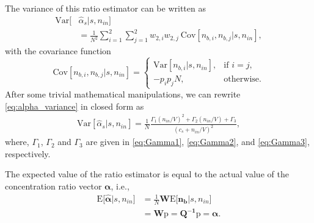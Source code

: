 \documentclass[twocolumn]{IEEEtran}
\newcommand{\p}{\mathrm{p}}
\newcommand{\E}{\mathrm{E}}
\newcommand{\Var}{\mathrm{Var}}
\newcommand{\Cov}{\mathrm{Cov}}
\begin{document}
The variance of this ratio estimator can be written as
\begin{align}\label{eq:alpha_variance}
\Var[&\hat{\alpha}_s|s, n_{in}] \\ \nonumber
&= \frac{1}{N^2}  \sum_{i=1}^2 \sum_{j=1}^2 w_{2,i} w_{2,j} ~\Cov[n_{b,i}, n_{b,j}|s, n_{in}],  
\end{align}
with the covariance function
\begin{equation}
\Cov[n_{b,i}, n_{b,j}| s, n_{in}]  = 
\begin{cases}
\Var[n_{b,i}| s, n_{in}],  & \text{if } i = j,\\
-p_i p_j N,    & \text{otherwise}.
\end{cases}
\label{eq:est_covariance}
\end{equation}
After some trivial mathematical manipulations, we can rewrite \eqref{eq:alpha_variance} in closed form as 
\begin{align}
\Var[\hat{\alpha}_s|s, n_{in}] = \frac{1}{N} \frac{\Gamma_1 (n_{in}/V)^2 + \Gamma_2 (n_{in}/V) + \Gamma_3}{(c_s + n_{in}/V)^2},  \label{eq:est_variance}
\end{align}
where, $\Gamma_1$, $\Gamma_2$ and $\Gamma_3$ are given in \eqref{eq:Gamma1}, \eqref{eq:Gamma2}, and \eqref{eq:Gamma3}, respectively.
\addtocounter{equation}{3}  


The expected value of the ratio estimator is equal to the actual value of the concentration ratio vector $\bm{\alpha}$, i.e.,
\begin{align}
\bm{\E[\hat{\alpha}}|s, n_{in} \bm{]} &= \frac{1}{N} \bm{W} \bm{\E[n_b}|s,n_{in}\bm{]}  \\ \nonumber
&= \bm{W} \bm{\p} = \bm{Q^{-1}} \bm{\p} = \bm{\alpha}.
\label{eq:meanratioest}
\end{align}
\end{document}
